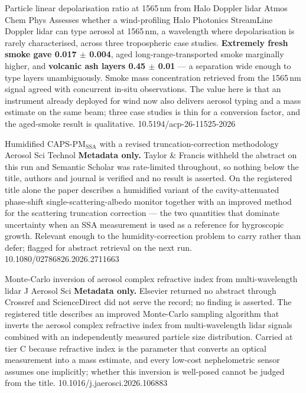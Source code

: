 \documentclass[10pt]{article}
\begin{document}

{Particle linear depolarisation ratio at 1565\,nm from Halo Doppler lidar}
{Atmos Chem Phys}
{Assesses whether a wind-profiling Halo Photonics StreamLine Doppler lidar can type aerosol
at 1565\,nm, a wavelength where depolarisation is rarely characterised, across three
tropospheric case studies. \textbf{Extremely fresh smoke gave 0.017 $\pm$ 0.004}, aged
long-range-transported smoke marginally higher, and \textbf{volcanic ash layers 0.45
$\pm$ 0.01} --- a separation wide enough to type layers unambiguously. Smoke mass
concentration retrieved from the 1565\,nm signal agreed with concurrent in-situ
observations. The value here is that an instrument already deployed for wind now also
delivers aerosol typing and a mass estimate on the same beam; three case studies is thin
for a conversion factor, and the aged-smoke result is qualitative.}
{10.5194/acp-26-11525-2026}

{Humidified CAPS-PM$_{\mathrm{SSA}}$ with a revised truncation-correction methodology}
{Aerosol Sci Technol}
{\textbf{Metadata only.} Taylor \& Francis withheld the abstract on this run and Semantic
Scholar was rate-limited throughout, so nothing below the title, authors and journal is
verified and no result is asserted. On the registered title alone the paper describes a
humidified variant of the cavity-attenuated phase-shift single-scattering-albedo monitor
together with an improved method for the scattering truncation correction --- the two
quantities that dominate uncertainty when an SSA measurement is used as a reference for
hygroscopic growth. Relevant enough to the humidity-correction problem to carry rather than
defer; flagged for abstract retrieval on the next run.}
{10.1080/02786826.2026.2711663}

{Monte-Carlo inversion of aerosol complex refractive index from multi-wavelength lidar}
{J Aerosol Sci}
{\textbf{Metadata only.} Elsevier returned no abstract through Crossref and ScienceDirect
did not serve the record; no finding is asserted. The registered title describes an improved
Monte-Carlo sampling algorithm that inverts the aerosol complex refractive index from
multi-wavelength lidar signals combined with an independently measured particle size
distribution. Carried at tier C because refractive index is the parameter that converts an
optical measurement into a mass estimate, and every low-cost nephelometric sensor assumes one
implicitly; whether this inversion is well-posed cannot be judged from the title.}
{10.1016/j.jaerosci.2026.106883}
\end{document}
